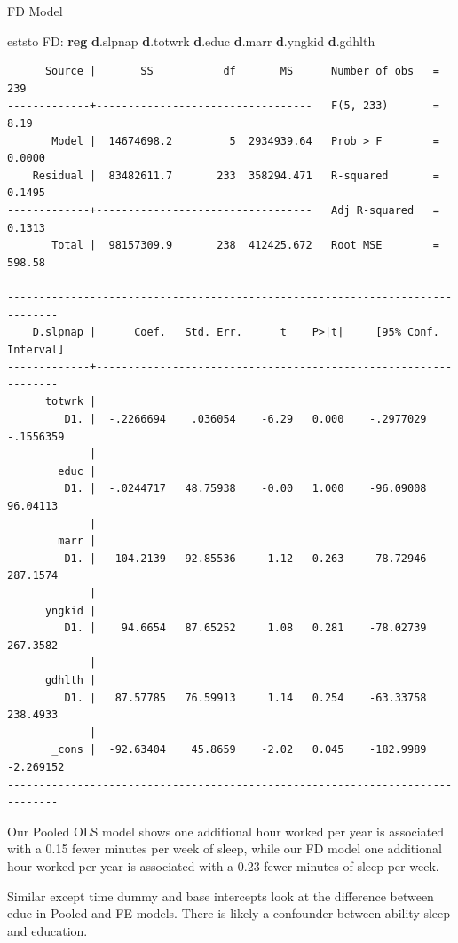 \documentclass[
]{book}
\newenvironment{Shaded}{\begin{snugshade}}{\end{snugshade}}
\newcommand{\KeywordTok}[1]{\textcolor[rgb]{0.13,0.29,0.53}{\textbf{#1}}}
\newcommand{\NormalTok}[1]{#1}
\begin{document}
FD Model

\begin{Shaded}
\begin{Highlighting}[]
\NormalTok{eststo FD: }\KeywordTok{reg} \KeywordTok{d}\NormalTok{.slpnap }\KeywordTok{d}\NormalTok{.totwrk }\KeywordTok{d}\NormalTok{.educ }\KeywordTok{d}\NormalTok{.marr }\KeywordTok{d}\NormalTok{.yngkid }\KeywordTok{d}\NormalTok{.gdhlth}
\end{Highlighting}
\end{Shaded}

\begin{verbatim}
      Source |       SS           df       MS      Number of obs   =       239
-------------+----------------------------------   F(5, 233)       =      8.19
       Model |  14674698.2         5  2934939.64   Prob > F        =    0.0000
    Residual |  83482611.7       233  358294.471   R-squared       =    0.1495
-------------+----------------------------------   Adj R-squared   =    0.1313
       Total |  98157309.9       238  412425.672   Root MSE        =    598.58

------------------------------------------------------------------------------
    D.slpnap |      Coef.   Std. Err.      t    P>|t|     [95% Conf. Interval]
-------------+----------------------------------------------------------------
      totwrk |
         D1. |  -.2266694    .036054    -6.29   0.000    -.2977029   -.1556359
             |
        educ |
         D1. |  -.0244717   48.75938    -0.00   1.000    -96.09008    96.04113
             |
        marr |
         D1. |   104.2139   92.85536     1.12   0.263    -78.72946    287.1574
             |
      yngkid |
         D1. |    94.6654   87.65252     1.08   0.281    -78.02739    267.3582
             |
      gdhlth |
         D1. |   87.57785   76.59913     1.14   0.254    -63.33758    238.4933
             |
       _cons |  -92.63404    45.8659    -2.02   0.045    -182.9989   -2.269152
------------------------------------------------------------------------------
\end{verbatim}

Our Pooled OLS model shows one additional hour worked per year is associated with a 0.15 fewer minutes per week of sleep, while our FD model one additional hour worked per year is associated with a 0.23 fewer minutes of sleep per week.

Similar except time dummy and base intercepts look at the difference between educ in Pooled and FE models. There is likely a confounder between ability sleep and education.
\end{document}
